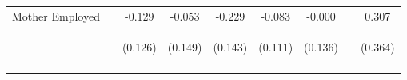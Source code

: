 \begin{tabular}{lcccccccc}
\noalign{\smallskip}Mother Employed &  & -0.129 & -0.053 & -0.229 & -0.083 & -0.000 &  & 0.307\\
 & \begin{footnotesize}\end{footnotesize} & \begin{footnotesize}(0.126)\end{footnotesize} & \begin{footnotesize}(0.149)\end{footnotesize} & \begin{footnotesize}(0.143)\end{footnotesize} & \begin{footnotesize}(0.111)\end{footnotesize} & \begin{footnotesize}(0.136)\end{footnotesize} & \begin{footnotesize}\end{footnotesize} & \begin{footnotesize}(0.364)\end{footnotesize}\\
\noalign{\smallskip}\hline\end{tabular}\\
